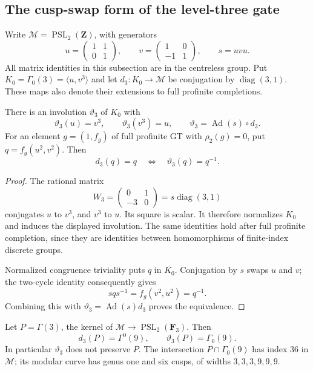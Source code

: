 \subsection{The cusp-swap form of the level-three gate}

Write \(\mathcal M=\operatorname{PSL}_2(\mathbf Z)\), with generators
\[
 u=\begin{pmatrix}1&1\\0&1\end{pmatrix},\qquad
 v=\begin{pmatrix}1&0\\-1&1\end{pmatrix},\qquad s=uvu.
\]
All matrix identities in this subsection are in the centreless
group. Put \(K_0=\Gamma_0(3)=\langle u,v^3\rangle\) and
let \(d_3:K_0\to\mathcal M\) be conjugation by
\(\operatorname{diag}(3,1)\). These maps also denote their
extensions to full profinite completions.

\begin{lemma}\label{lem:level3-cusp-swap-gate}
There is an involution \(\vartheta_3\) of \(K_0\) with
\[
 \vartheta_3(u)=v^3,\qquad \vartheta_3(v^3)=u,\qquad
 \vartheta_3=\operatorname{Ad}(s)\circ d_3.
\]
For an element \(g=(1,f_g)\) of full profinite GT with
\(\rho_2(g)=0\),
put \(q=f_g(u^2,v^2)\). Then
\[
 d_3(q)=q\quad\Longleftrightarrow\quad
 \vartheta_3(q)=q^{-1}.
\]
\end{lemma}

\begin{proof}
The rational matrix
\[
 W_3=\begin{pmatrix}0&1\\-3&0\end{pmatrix}
       =s\operatorname{diag}(3,1)
\]
conjugates \(u\) to \(v^3\), and \(v^3\) to \(u\).
Its square is scalar. It therefore normalizes \(K_0\) and
induces the displayed involution. The same identities hold
after full profinite completion, since they are identities
between homomorphisms of finite-index discrete groups.

Normalized congruence triviality puts \(q\) in
\(\overline{K_0}\). Conjugation by \(s\) swaps \(u\) and \(v\);
the two-cycle identity consequently gives
\[
 s q s^{-1}=f_g(v^2,u^2)=q^{-1}.
\]
Combining this with \(\vartheta_3=\operatorname{Ad}(s)d_3\)
proves the equivalence.
\end{proof}

\begin{lemma}\label{lem:level3-principal-image}
Let \(P=\Gamma(3)\), the kernel of
\(\mathcal M\to\operatorname{PSL}_2(\mathbf F_3)\). Then
\[
 d_3(P)=\Gamma^0(9),\qquad
 \vartheta_3(P)=\Gamma_0(9).
\]
In particular \(\vartheta_3\) does not preserve \(P\).
The intersection \(P\cap\Gamma_0(9)\) has index \(36\) in
\(\mathcal M\); its modular curve has genus one and six cusps, of
widths \(3,3,3,9,9,9\).
\end{lemma}

